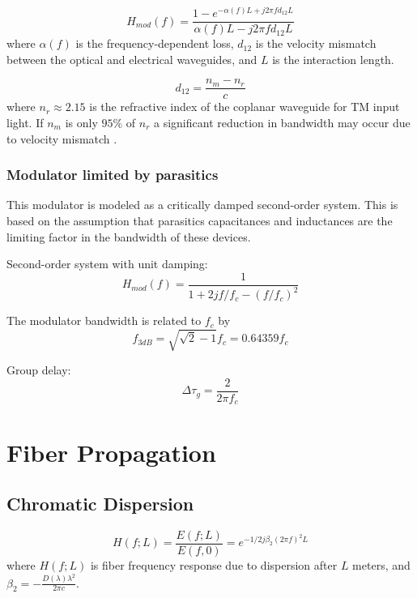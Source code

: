 \documentclass[a4paper]{article}
\begin{document}
\begin{equation}
H_{mod}(f) = \frac{1-e^{-\alpha(f)L+j2\pi fd_{12}L}}{\alpha(f)L-j2\pi fd_{12}L}
\end{equation}
where $\alpha(f)$ is the frequency-dependent loss, $d_{12}$ is the velocity mismatch between the optical and electrical waveguides, and $L$ is the interaction length.

\begin{equation}
d_{12} = \frac{n_m-n_r}{c}
\end{equation}
where $n_r \approx 2.15$ is the refractive index of the coplanar waveguide for TM input light. If $n_m$ is only $95\%$ of $n_r$ a significant reduction in bandwidth may occur due to velocity mismatch \cite{Ho2005}.

\subsubsection{Modulator limited by parasitics}
This modulator is modeled as a critically damped second-order system. This is based on the assumption that parasitics capacitances and inductances are the limiting factor in the bandwidth of these devices.

Second-order system with unit damping:
\begin{equation}
H_{mod}(f) =  \frac{1}{1 + 2jf/f_c - (f/f_c)^2}
\end{equation}

The modulator bandwidth is related to $f_c$ by
\begin{equation}
f_{3dB} = \sqrt{\sqrt{2}-1}f_c = 0.64359f_c
\end{equation}

Group delay:
\begin{equation}
\Delta\tau_g = \frac{2}{2\pi f_c}
\end{equation}

\section{Fiber Propagation}
\subsection{Chromatic Dispersion}
\begin{equation} \label{eq:Hdisp}
H(f; L) = \frac{E(f; L)}{E(f, 0)} = e^{-1/2j\beta_2(2\pi f)^2L}
\end{equation}
where $H(f; L)$ is fiber frequency response due to dispersion after $L$ meters, and $\beta_2 = -\frac{D(\lambda)\lambda^2}{2\pi c}$. 
\end{document}
